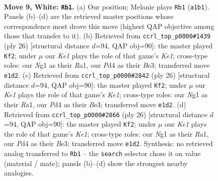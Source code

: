 \documentclass[11pt]{article}
\begin{document}
\clearpage

\begin{figure}[p]\centering
\begin{subfigure}{0.46\textwidth}\centering
\resizebox{\linewidth}{!}{%
\newchessgame
\chessboard[
  setfen={rnb1k2r/1ppn1ppp/p3p3/3pP3/1q1P1P1P/2N5/PPP3P1/R2QKBNR w KQkq - 1 9},
  showmover=false,
  pgfstyle=straightmove, color=movearrow, markmove={a1-b1}
]}
\caption{}
\end{subfigure}\hfill
\begin{subfigure}{0.46\textwidth}\centering
\resizebox{\linewidth}{!}{%
\newchessgame
\chessboard[
  setfen={rn1qk2r/1b1n1pp1/p3p2p/3pP3/1b1N1PPP/2N1B3/1PP5/R2QKB1R w KQkq - 0 14},
  showmover=false,
  pgfstyle=straightmove, color=movearrow, markmove={e1-f2}
]}
\caption{}
\end{subfigure}
\\[4pt]
\begin{subfigure}{0.46\textwidth}\centering
\resizebox{\linewidth}{!}{%
\newchessgame
\chessboard[
  setfen={rn1qk2r/1b1n1pp1/p3p2p/3pP3/1b1N1PPP/2N1B3/1PP5/R2QKB1R w KQkq - 0 14},
  showmover=false,
  pgfstyle=straightmove, color=movearrow, markmove={e1-f2}
]}
\caption{}
\end{subfigure}\hfill
\begin{subfigure}{0.46\textwidth}\centering
\resizebox{\linewidth}{!}{%
\newchessgame
\chessboard[
  setfen={rn1qk2r/1b1n1pp1/p3p2p/3pP3/1b1N1PPP/2N1B3/1PP5/R2QKB1R w KQkq - 0 14},
  showmover=false,
  pgfstyle=straightmove, color=movearrow, markmove={e1-f2}
]}
\caption{}
\end{subfigure}
\caption{\textbf{Move 9, White: \texttt{Rb1}.} (a) Our position; Melanie plays \texttt{Rb1} (\texttt{a1b1}). Panels (b)--(d) are the retrieved master positions whose correspondence most drove this move (highest QAP objective among those that transfer to it). (b) Retrieved from \texttt{ccrl\_top\_p0000\#1439} (ply 26) [structural distance $d$=94, QAP obj=90]: the master played \texttt{Kf2}; under $\mu$ our \emph{Ke1} plays the role of that game's \emph{Ke1}; cross-type roles: our \emph{N}g1 as their \emph{R}a1, our \emph{P}d4 as their \emph{B}e3; transferred move \texttt{e1d2}. (c) Retrieved from \texttt{ccrl\_top\_p0000\#2842} (ply 26) [structural distance $d$=94, QAP obj=90]: the master played \texttt{Kf2}; under $\mu$ our \emph{Ke1} plays the role of that game's \emph{Ke1}; cross-type roles: our \emph{N}g1 as their \emph{R}a1, our \emph{P}d4 as their \emph{B}e3; transferred move \texttt{e1d2}. (d) Retrieved from \texttt{ccrl\_top\_p0000\#2866} (ply 26) [structural distance $d$=94, QAP obj=90]: the master played \texttt{Kf2}; under $\mu$ our \emph{Ke1} plays the role of that game's \emph{Ke1}; cross-type roles: our \emph{N}g1 as their \emph{R}a1, our \emph{P}d4 as their \emph{B}e3; transferred move \texttt{e1d2}. Synthesis: no retrieved analog transferred to \texttt{Rb1} -- the \texttt{search} selector chose it on value (material / mate); panels (b)--(d) show the strongest nearby analogies.}
\label{fig:thought-m16}
\end{figure}
\end{document}
